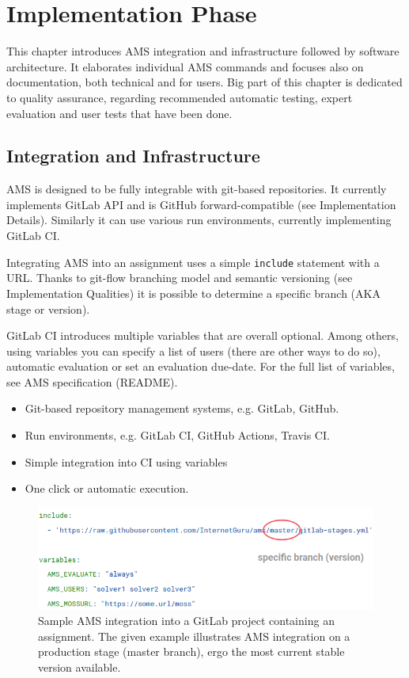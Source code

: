 \chapter{Implementation Phase} \label{chap:implementation}

{This chapter introduces AMS integration and infrastructure followed by software architecture. It elaborates individual AMS commands and focuses also on documentation, both technical and for users. Big part of this chapter is dedicated to quality assurance, regarding recommended automatic testing, expert evaluation and user tests that have been done.}

\section{Integration and Infrastructure}\label{sec:intandinf}

{AMS is designed to be fully integrable with git-based repositories. It currently implements GitLab API and is GitHub forward-compatible (see Implementation Details). Similarly it can use various run environments, currently implementing GitLab CI.}

{Integrating AMS into an assignment uses a simple \texttt{include} statement with a URL. Thanks to git-flow branching model and semantic versioning (see Implementation Qualities) it is possible to determine a specific branch (AKA stage or version).}

{GitLab CI introduces multiple variables that are overall optional. Among others, using variables you can specify a list of users (there are other ways to do so), automatic evaluation or set an evaluation due-date. For the full list of variables, see AMS specification (README).}

\begin{itemize}
\item
  {Git-based repository management systems, e.g. GitLab, GitHub.}
\item
  {Run environments, e.g. GitLab CI, GitHub Actions, Travis CI.}
\item
  {Simple integration into CI using variables}
\item
  {One click or automatic execution.}
\end{itemize}

\begin{figure}[H]
    \centering
    \includegraphics[width=\textwidth,height=\textheight,keepaspectratio]{Figures/impl/image7.png}
    \caption[Sample AMS integration into a GitLab project]{Sample AMS integration into a GitLab project containing an assignment. The given example illustrates AMS integration on a production stage (master branch), ergo the most current stable version available.}
\end{figure}

